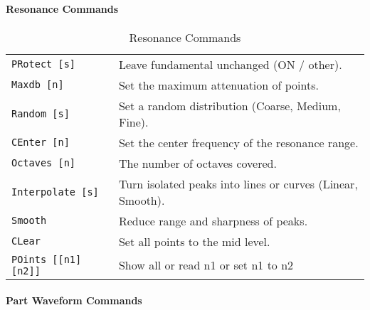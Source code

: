 \begin{table}[H]
\begin{tabular}{l l}
      \end{tabular}
   \end{table}

\paragraph{Resonance Commands}
\label{paragraph:command_line_resonance_commands}

   \begin{table}[H]
      \centering
      \caption{Resonance Commands}
      \label{table:resonance_commands}
      \begin{tabular}{l l}

   \texttt{PRotect [s]} &
      Leave fundamental unchanged (ON / other). \\
   \texttt{Maxdb [n]} &
      Set the maximum attenuation of points. \\
   \texttt{Random [s]} &
      Set a random distribution (Coarse, Medium, Fine). \\
   \texttt{CEnter [n]} &
      Set the center frequency of the resonance range. \\
   \texttt{Octaves [n]} &
      The number of octaves covered. \\
   \texttt{Interpolate [s]} &
      Turn isolated peaks into lines or curves (Linear, Smooth). \\
   \texttt{Smooth} &
      Reduce range and sharpness of peaks. \\
   \texttt{CLear} &
      Set all points to the mid level. \\
   \texttt{POints [[n1] [n2]]} &
      Show all or read n1 or set n1 to n2 \\

      \end{tabular}
   \end{table}

\paragraph{Part Waveform Commands}
\label{paragraph:command_line_part_waveform_commands}

